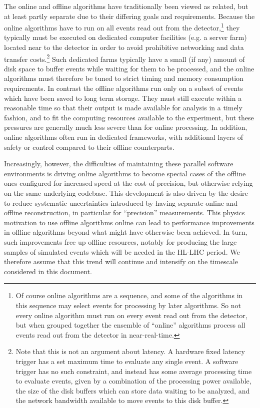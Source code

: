 The online and offline algorithms have traditionally been viewed as related, but at least partly separate due to their differing goals and requirements. Because the online 
algorithms have to run on all events read out from the detector,\footnote{Of course online algorithms are a sequence, and some of the algorithms in this sequence may select 
events for processing by later algorithms. So not every online algorithm must run on every event read out from the detector, but when grouped together the ensemble of ``online'' 
algorithms process all events read out from the detector in near-real-time.}
they typically must be executed on dedicated computer facilities (e.g. a server farm) located 
near to the detector in order to avoid prohibitive networking and data transfer costs.\footnote{Note that this is not an argument about latency. A hardware fixed latency trigger 
has a set maximum time to evaluate any single event. A software trigger has no such constraint, and instead has some average processing time to evaluate events, given by a 
combination of the processing power available, the size of the disk buffers which can store data waiting to be analyzed, and the network bandwidth available to move events to this disk buffer. } 
Such dedicated farms typically have a small (if any) amount of disk space 
to buffer events while waiting for them to be processed, and the online algorithms must therefore be tuned to strict timing and memory consumption requirements. In contrast 
the offline algorithms run only on a subset of events which have been saved to long term storage. They must still execute within a reasonable time so that their output is made 
available for analysis in a timely fashion, and to fit the computing resources available to the experiment, but these pressures are generally much less severe than for online 
processing. In addition, online algorithms often run in dedicated frameworks, with additional layers of safety or control compared to their offline counterparts. 

Increasingly, however, the difficulties of maintaining these parallel software environments is driving online algorithms to become special cases of the offline ones configured 
for increased speed at the cost of precision, but otherwise relying on the same underlying codebase. This development is also driven by the desire to reduce systematic uncertainties 
introduced by having separate online and offline reconstruction, in particular for ``precision'' measurements.
This physics motivation to use offline algorithms online can lead to performance improvements in offline algorithms beyond what might have otherwise been achieved. In turn, such 
improvements free up offline resources, notably for producing the large samples of simulated events which will be needed in the HL-LHC period. We therefore assume that this trend 
will continue and intensify on the timescale considered in this document.

